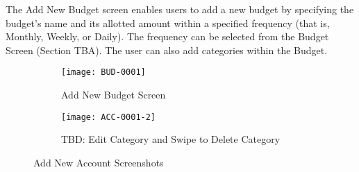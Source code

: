 

The Add New Budget screen enables users to add a new budget by specifying the budget's name and its allotted amount within a specified frequency (that is, Monthly, Weekly, or Daily). The frequency can be selected from the Budget Screen (Section TBA). The user can also add categories within the Budget.


\begin{figure}[h]
 
\begin{subfigure}{0.5\textwidth}
  \texttt{[image: BUD-0001]} 
  \caption{Add New Budget Screen}
  \label{fig:sub-budget-1}
\end{subfigure}
\begin{subfigure}{0.5\textwidth}
  \texttt{[image: ACC-0001-2]}
  \caption{TBD: Edit Category and Swipe to Delete Category}
  \label{fig:sub-budget-2}
\end{subfigure}
\caption{Add New Account Screenshots}
\end{figure}

